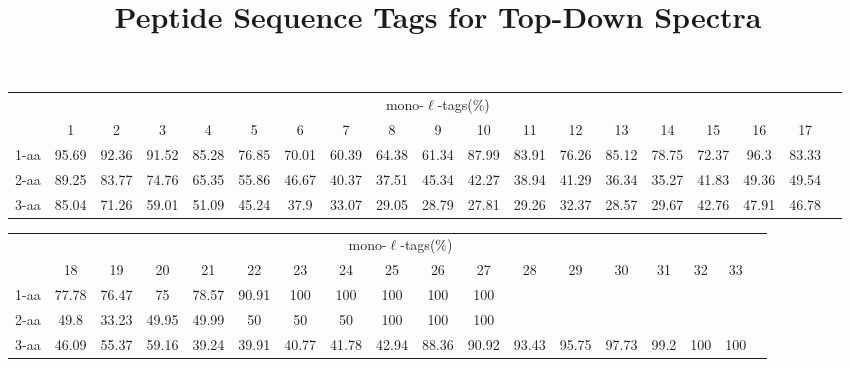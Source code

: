 \documentclass{article}[12pt]
\title{Peptide Sequence Tags for Top-Down Spectra}
\author{}
\begin{document}
\maketitle

\doublespacing
\begin{abstract}


\end{abstract}


\begin{landscape}

\begin{table}[h]\tiny
\vspace{3mm}
{\centering
\begin{center}
\begin{tabular}{|l|c|c|c|c|c|c|c|c|c|c|c|c|c|c|c|c|c|c|}
  \hline
  & \multicolumn{ 17 }{|c|}{mono-$\ell$-tags(\%)} \\
  \cline{2- 18}
    & 1 & 2 & 3 & 4 & 5 & 6 & 7 & 8 & 9 & 10 & 11 & 12 & 13 & 14 & 15 & 16 & 17\\
  \hline
1-aa  & 95.69 & 92.36 & 91.52 & 85.28 & 76.85 & 70.01 & 60.39 & 64.38 & 61.34 & 87.99 & 83.91 & 76.26 & 85.12 & 78.75 & 72.37 & 96.3 & 83.33\\
2-aa  & 89.25 & 83.77 & 74.76 & 65.35 & 55.86 & 46.67 & 40.37 & 37.51 & 45.34 & 42.27 & 38.94 & 41.29 & 36.34 & 35.27 & 41.83 & 49.36 & 49.54\\
3-aa  & 85.04 & 71.26 & 59.01 & 51.09 & 45.24 & 37.9 & 33.07 & 29.05 & 28.79 & 27.81 & 29.26 & 32.37 & 28.57 & 29.67 & 42.76 & 47.91 & 46.78\\
 \hline
\end{tabular}
\end{center}
\par}
\centering

\vspace{3mm}
\end{table}
\begin{table}[h]\tiny
\vspace{3mm}
{\centering
\begin{center}
\begin{tabular}{|l|c|c|c|c|c|c|c|c|c|c|c|c|c|c|c|c|c|}
  \hline
  & \multicolumn{ 16 }{|c|}{mono-$\ell$-tags(\%)} \\
  \cline{2- 17}
    & 18 & 19 & 20 & 21 & 22 & 23 & 24 & 25 & 26 & 27 & 28 & 29 & 30 & 31 & 32 & 33\\
  \hline
1-aa  & 77.78 & 76.47 & 75 & 78.57 & 90.91 & 100 & 100 & 100 & 100 & 100 &  &  &  &  &  & \\
2-aa  & 49.8 & 33.23 & 49.95 & 49.99 & 50 & 50 & 50 & 100 & 100 & 100 &  &  &  &  &  & \\
3-aa  & 46.09 & 55.37 & 59.16 & 39.24 & 39.91 & 40.77 & 41.78 & 42.94 & 88.36 & 90.92 & 93.43 & 95.75 & 97.73 & 99.2 & 100 & 100\\
 \hline
\end{tabular}
\end{center}
\par}
\centering


\end{table}
\end{landscape}
\end{document}
